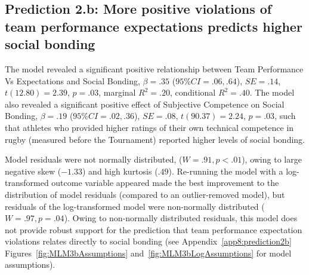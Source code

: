 \begin{CJK}{UTF8}{gbsn}
\subsection{Prediction 2.b: More positive violations of team performance expectations predicts higher social bonding}

The model revealed a significant positive relationship between Team Performance Vs Expectations and Social Bonding, $\beta = .35$ ($95\% CI = .06, .64$), $SE = .14$, $t(12.80) = 2.39$, $p = .03$, marginal $R^2 = .20$, conditional $R^2 = .40$.  The model also revealed a significant positive effect of Subjective Competence on Social Bonding, $\beta = .19$ ($95\% CI =  .02, .36$), $SE = .08$, $t(90.37) = 2.24$, $p = .03$, such that athletes who provided higher ratings of their own technical competence in rugby (measured before the Tournament) reported higher levels of social bonding.

Model residuals were not normally distributed, ($W = .91, p < .01$), owing to large negative skew ($-1.33$) and high kurtosis ($.49$). Re-running the model with a log-transformed outcome variable appeared made the best improvement to the distribution of model residuals (compared to an outlier-removed model), but residuals of the log-transformed model were non-normally distributed ($W = .97, p = .04$).  Owing to non-normally distributed residuals, this model does not provide robust support for the prediction that team performance expectation violations relates directly to social bonding (see Appendix~\ref{app8:prediction2b} Figures~\ref{fig:MLM3bAssumptions} and~\ref{fig:MLM3bLogAssumptions} for model assumptions).





\end{CJK}
